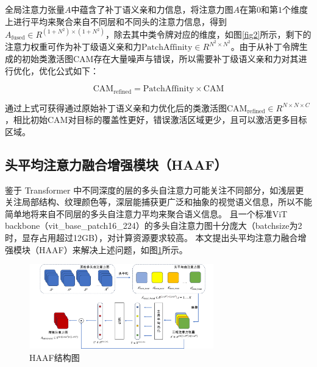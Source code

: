 
全局注意力张量$A$中蕴含了补丁语义亲和力信息，将注意力图$A$在第$0$和第$1$个维度上进行平均来聚合来自不同层和不同头的注意力信息，得到$A_{\text{fused}}\in R^{(1+N^2)\times (1+N^2)}$，除去其中类令牌对应的维度，如图\ref{fig2}所示，剩下的注意力权重可作为补丁级语义亲和力$\text{PatchAffinity}\in R^{N^2 \times N^2}$。由于从补丁令牌生成的初始类激活图CAM存在大量噪声与错误，所以需要补丁级语义亲和力对其进行优化，优化公式如下：

\begin{equation}
    \text{CAM}_{\text{refined}}=\text{PatchAffinity}\times \text{CAM}
\end{equation}

通过上式可获得通过原始补丁语义亲和力优化后的类激活图$\text{CAM}_\text{refined}\in R^{N\times N\times C}$，相比初始CAM对目标的覆盖性更好，错误激活区域更少，且可以激活更多目标区域。


\vspace{2mm}


\begin{CJK*}{UTF8}{zhhei}
    \subsection{头平均注意力融合增强模块（HAAF）}
    \label{section3.3_HAAF}
\end{CJK*}

鉴于 Transformer 中不同深度的层的多头自注意力可能关注不同部分，如浅层更关注局部结构、纹理颜色等，深层能捕获更广泛和抽象的视觉语义信息，所以不能简单地将来自不同层的多头自注意力平均来聚合语义信息。
且一个标准ViT backbone（vit\_base\_patch16\_224）的多头自注意力图十分庞大（batchsize为2时，显存占用超过12GB），对计算资源要求较高。
本文提出头平均注意力融合增强模块（HAAF）来解决上述问题，如图\ref{fig3}所示。

\begin{figure}[htbp]
    \centerline{\includegraphics[width=3.15in]{fig/fig3.pdf}}
    \begin{CJK*}{UTF8}{fs}
        \caption{HAAF结构图}\label{fig3}
    \end{CJK*}
\end{figure}

